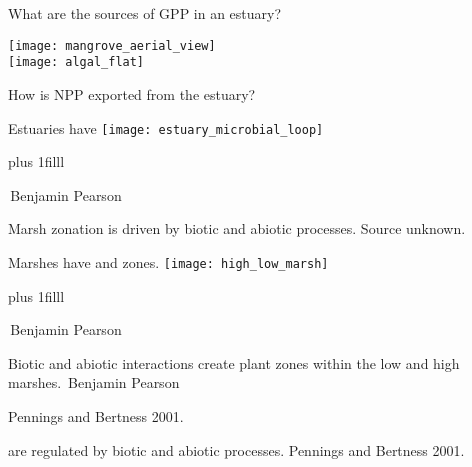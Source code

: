 \documentclass[t]{beamer}
\newcommand\skiptobottom{%
	\vskip0pt plus 1filll%
}
\begin{document}

\begin{frame}[t]{What are the sources of GPP in an estuary?}

	\begin{multicols}{2}
	
		\texttt{[image: mangrove\_aerial\_view]}\\
		\texttt{[image: algal\_flat]}
	\columnbreak
	
		\hangpara{}
		
		\hangpara How is NPP exported from the estuary?
		
	\end{multicols}
	
\end{frame}
%
\begin{frame}[t]{Estuaries have }
	\texttt{[image: estuary\_microbial\_loop]}

	\skiptobottom

	\tiny\textcopyright\,Benjamin Pearson
	
\end{frame}
%
{
\begin{frame}[b]{Marsh zonation is driven by biotic and abiotic processes.}
\hfill\tiny\textcolor{green4}{Source unknown.}
\end{frame}
}
%
\begin{frame}[t]{Marshes have  and  zones.}
	\texttt{[image: high\_low\_marsh]}

	\skiptobottom

	\tiny\textcopyright\,Benjamin Pearson
	
\end{frame}
%
{
\begin{frame}[b]{Biotic and abiotic interactions create plant zones within the low and high marshes.}
\tiny\textcopyright\,Benjamin Pearson
\end{frame}
}
%
{
\begin{frame}[b]{}
\tiny Pennings and Bertness 2001. 
\end{frame}
}
%
{
\begin{frame}[b]{ are regulated by biotic and abiotic processes.}
\tiny Pennings and Bertness 2001. 
\end{frame}
}
\end{document}
